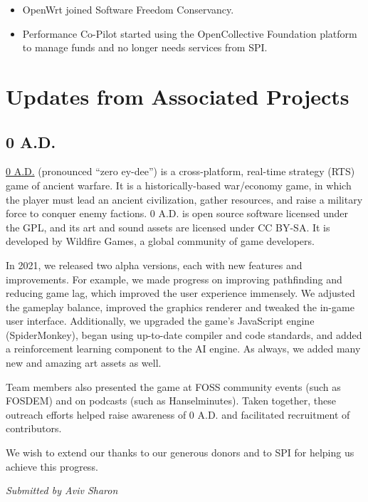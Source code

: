 \documentclass[a4paper]{report}
\begin{document}
\begin{itemize}

\item OpenWrt joined Software Freedom Conservancy.

\item Performance Co-Pilot started using the OpenCollective Foundation platform to manage funds and no longer needs services from SPI.

\end{itemize}

\section{Updates from Associated Projects}

\subsection{0 A.D.}

\href{https://play0ad.com/}{0 A.D.} (pronounced ``zero ey-dee'') is a cross-platform, real-time strategy (RTS) game of ancient warfare. It is a historically-based war/economy game, in which the player must lead an ancient civilization, gather resources, and raise a military force to conquer enemy factions. 0 A.D. is open source software licensed under the GPL, and its art and sound assets are licensed under CC BY-SA. It is developed by Wildfire Games, a global community of game developers.

In 2021, we released two alpha versions, each with new features and improvements. For example, we made progress on improving pathfinding and reducing game lag, which improved the user experience immensely. We adjusted the gameplay balance, improved the graphics renderer and tweaked the in-game user interface. Additionally, we upgraded the game's JavaScript engine (SpiderMonkey), began using up-to-date compiler and code standards, and added a reinforcement learning component to the AI engine. As always, we added many new and amazing art assets as well.

Team members also presented the game at FOSS community events (such as FOSDEM) and on podcasts (such as Hanselminutes). Taken together, these outreach efforts helped raise awareness of 0 A.D. and facilitated recruitment of contributors.

We wish to extend our thanks to our generous donors and to SPI for helping us achieve this progress.

{\em Submitted by Aviv Sharon}
\end{document}
